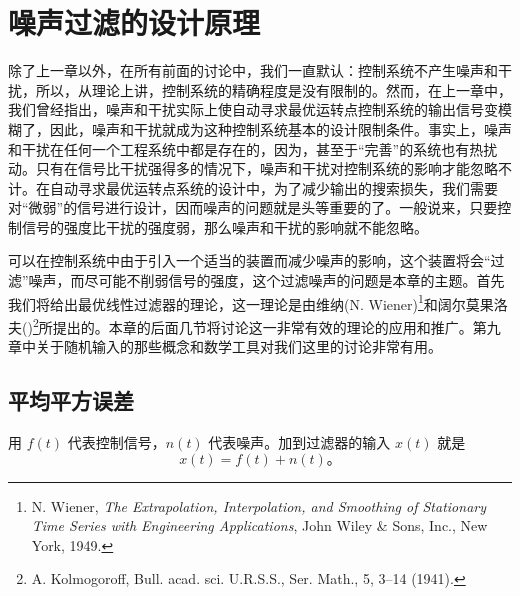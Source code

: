 
\chapter{噪声过滤的设计原理}\label{chapter_16}

除了上一章以外，在所有前面的讨论中，我们一直默认：控制系统不产生噪声和干扰，所以，从理论上讲，控制系统的精确程度是没有限制的。然而，在上一章中，我们曾经指出，噪声和干扰实际上使自动寻求最优运转点控制系统的输出信号变模糊了，因此，噪声和干扰就成为这种控制系统基本的设计限制条件。事实上，噪声和干扰在任何一个工程系统中都是存在的，因为，甚至于“完善”的系统也有热扰动。只有在信号比干扰强得多的情况下，噪声和干扰对控制系统的影响才能忽略不计。在自动寻求最优运转点系统的设计中，为了减少输出的搜索损失，我们需要对“微弱”的信号进行设计，因而噪声的问题就是头等重要的了。一般说来，只要控制信号的强度比干扰的强度弱，那么噪声和干扰的影响就不能忽略。

可以在控制系统中由于引入一个适当的装置而减少噪声的影响，这个装置将会“过滤”噪声，而尽可能不削弱信号的强度，这个过滤噪声的问题是本章的主题。首先我们将给出最优线性过滤器的理论，这一理论是由维纳(N. Wiener)\footnote{N. Wiener, \textit{The Extrapolation, Interpolation, and Smoothing of Stationary Time Series with Engineering Applications}, John Wiley \& Sons, Inc., New York, 1949.}和阔尔莫果洛夫()\footnote{A. Kolmogoroff, Bull. acad. sci. U.R.S.S., Ser. Math., 5, 3–14 (1941).}所提出的。本章的后面几节将讨论这一非常有效的理论的应用和推广。第九章中关于随机输入的那些概念和数学工具对我们这里的讨论非常有用。

\section{平均平方误差}

用 $f(t)$ 代表控制信号，$n(t)$ 代表噪声。加到过滤器的输入 $x(t)$ 就是
\begin{equation}
x(t) = f(t) + n(t)。
\label{eq:ch16_input_signal_noise_sum}
\end{equation}

